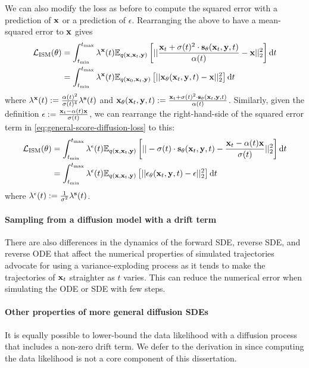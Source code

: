 We can also modify the loss as before to compute the squared error with a prediction of ${\mathbf{x}}$ or a prediction of $\epsilon$. Rearranging the above to have a mean-squared error to ${\mathbf{x}}$ gives
\begin{align} \label{eq:general-x0-diffusion-loss}
    \mathcal{L}_\text{ISM}(\theta) &= \int_{t_\text{min}}^{t_\text{max}} \lambda^{\mathbf{x}}(t) \mathbb{E}_{q({\mathbf{x}}, {\mathbf{x}}_t, {\mathbf{y}})} \left[ 
    || \frac{{\mathbf{x}}_t + \sigma(t)^2 \cdot {\mathbf{s}}_\theta({\mathbf{x}}_t, {\mathbf{y}}, t)}{\alpha(t)} - {\mathbf{x}} ||_2^2 \right] \mathrm{d}t \\
    &= \int_{t_\text{min}}^{t_\text{max}} \lambda^{\mathbf{x}}(t) \mathbb{E}_{q({\mathbf{x}}_0, {\mathbf{x}}_t, {\mathbf{y}})} \left[ 
    || {\mathbf{x}}_\theta({\mathbf{x}}_t, {\mathbf{y}}, t) - {\mathbf{x}} ||_2^2 \right] \mathrm{d}t
\end{align}
where $\lambda^{\mathbf{x}}(t) := \frac{\alpha(t)^2}{\sigma(t)^4}\lambda^{\mathbf{s}}(t)$ and ${\mathbf{x}}_\theta({\mathbf{x}}_t, {\mathbf{y}}, t) := \frac{{\mathbf{x}}_t + \sigma(t)^2 \cdot {\mathbf{s}}_\theta({\mathbf{x}}_t, {\mathbf{y}}, t)}{\alpha(t)}$. Similarly, given the definition $\epsilon := \frac{{\mathbf{x}}_t - \alpha(t) {\mathbf{x}}}{\sigma(t)}$, we can rearrange the right-hand-side of the squared error term in \cref{eq:general-score-diffusion-loss} to this:
\begin{align} \label{eq:general-epsilon-diffusion-loss}
    \mathcal{L}_\text{ISM}(\theta) &= \int_{t_\text{min}}^{t_\text{max}} \lambda^\epsilon(t) \mathbb{E}_{q({\mathbf{x}}, {\mathbf{x}}_t, {\mathbf{y}})} \left[ 
    || -\sigma(t) \cdot {\mathbf{s}}_\theta({\mathbf{x}}_t, {\mathbf{y}}, t) - \frac{{\mathbf{x}}_t-\alpha(t){\mathbf{x}}}{\sigma(t)} ||_2^2 \right] \mathrm{d}t \\
    &= \int_{t_\text{min}}^{t_\text{max}} \lambda^\epsilon(t) \mathbb{E}_{q({\mathbf{x}}, {\mathbf{x}}_t, {\mathbf{y}})} \left[ 
    || \mathbf{\epsilon}_\theta({\mathbf{x}}_t, {\mathbf{y}}, t) - \epsilon ||_2^2 \right] \mathrm{d}t
\end{align}
where $\lambda^\epsilon(t) := \frac{1}{\sigma^2} \lambda^{\mathbf{s}}(t)$.

\paragraph{Sampling from a diffusion model with a drift term}
There are also differences in the dynamics of the forward SDE, reverse SDE, and reverse ODE that affect the numerical properties of simulated trajectories \citet{karras2022elucidating} advocate for using a variance-exploding process as it tends to make the trajectories of ${\mathbf{x}}_t$ straighter as $t$ varies. This can reduce the numerical error when simulating the ODE or SDE with few steps.

\paragraph{Other properties of more general diffusion SDEs}
It is equally possible to lower-bound the data likelihood with a diffusion process that includes a non-zero drift term. We defer to the derivation in \citet{kingma2021variational} since computing the data likelihood is not a core component of this dissertation.